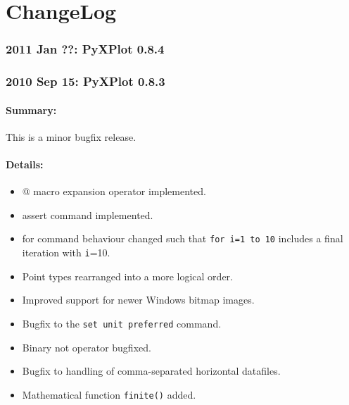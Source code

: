 %
%
%
%
%



\chapter{ChangeLog}

\subsection*{2011 Jan ??: PyXPlot 0.8.4}

\subsection*{2010 Sep 15: PyXPlot 0.8.3}

\subsubsection*{Summary:}

This is a minor bugfix release.

\subsubsection*{Details:}

\begin{itemize}
\item @ macro expansion operator implemented.
\item assert command implemented.
\item for command behaviour changed such that {\tt for i=1 to 10} includes a final iteration with {\tt i}=10.
\item Point types rearranged into a more logical order.
\item Improved support for newer Windows bitmap images.
\item Bugfix to the {\tt set unit preferred} command.
\item Binary not operator bugfixed.
\item Bugfix to handling of comma-separated horizontal datafiles.
\item Mathematical function {\tt finite()} added.
\end{itemize}

